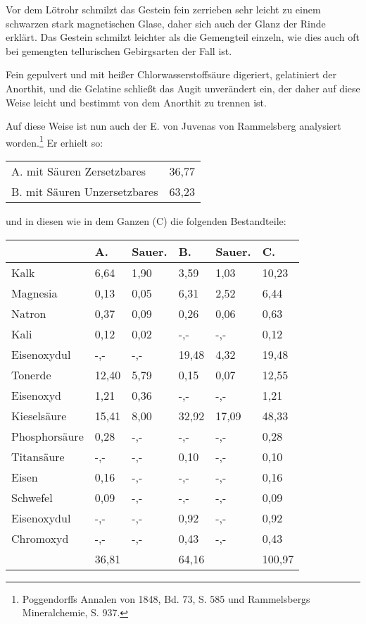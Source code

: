 \documentclass[a4paper, 11pt, oneside]{article}
\begin{document}
Vor dem Lötrohr schmilzt das Gestein fein zerrieben sehr leicht zu einem schwarzen stark magnetischen Glase, daher sich auch der Glanz der Rinde erklärt. Das Gestein schmilzt leichter als die Gemengteil einzeln, wie dies auch oft bei gemengten tellurischen Gebirgsarten der Fall ist.

Fein gepulvert und mit heißer Chlorwasserstoffsäure digeriert, gelatiniert der Anorthit, und die Gelatine schließt das Augit unverändert ein, der daher auf diese Weise leicht und bestimmt von dem Anorthit zu trennen ist.

Auf diese Weise ist nun auch der E. von Juvenas von Rammelsberg analysiert worden.\footnote{Poggendorffs Annalen von 1848, Bd. 73, S. 585 und Rammelsbergs Mineralchemie, S. 937.} Er erhielt so:
\begin{center}
\begin{tabular}{ l r }
    A. mit Säuren Zersetzbares & 36,77\\
    B. mit Säuren Unzersetzbares & 63,23\\
\end{tabular}
\end{center}
und in diesen wie in dem Ganzen (C) die folgenden Bestandteile:
\begin{center}
\end{center}
\begin{center}
\begin{tabular}{ |p{23mm}|p{12mm}|p{8mm}|p{13mm}|p{8mm}|p{11mm}| }
    \hline
     & A. & Sauer. & B. & Sauer. & C.\\
    \hline\hline
    Kalk & 6,64 & 1,90 & 3,59 & 1,03 & 10,23\\\hline
    Magnesia & 0,13 & 0,05 & 6,31 & 2,52 & 6,44\\\hline
    Natron & 0,37 & 0,09 & 0,26 & 0,06 & 0,63\\\hline
    Kali & 0,12 & 0,02 & -,- & -,- & 0,12\\\hline
    Eisenoxydul & -,- & -,- & 19,48 & 4,32 & 19,48\\\hline
    Tonerde & 12,40 & 5,79 & 0,15 & 0,07 & 12,55\\\hline
    Eisenoxyd & 1,21 & 0,36 & -,- & -,- & 1,21\\\hline
    Kieselsäure & 15,41 & 8,00 & 32,92 & 17,09 & 48,33\\\hline
    Phosphorsäure & 0,28 & -,- & -,- & -,- & 0,28\\\hline
    Titansäure & -,- & -,- & 0,10 & -,- & 0,10\\\hline
    Eisen & 0,16 & -,- & -,- & -,- & 0,16\\\hline
    Schwefel & 0,09 & -,- & -,- & -,- & 0,09\\\hline
    Eisenoxydul & -,- & -,- & 0,92 & -,- & 0,92\\\hline
    Chromoxyd & -,- & -,- & 0,43 & -,- & 0,43\\\hline
     & 36,81 & & 64,16 & & 100,97\\
    \hline
\end{tabular}
\end{center}
\end{document}
